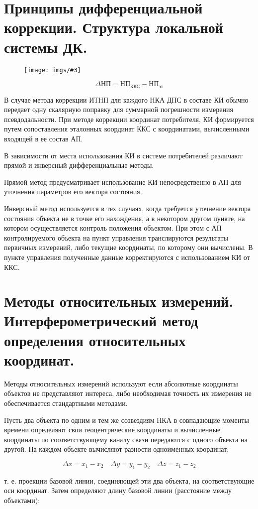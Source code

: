\documentclass[14pt,a4paper,oneside]{extarticle}
\newcommand{\pic}[3]{
	\begin{figure}[#1]
		\begin{center}
			\texttt{[image: imgs/\#3]}
		\end{center}
	\end{figure}
}
\begin{document}
\section{Принципы дифференциальной коррекции. Структура локальной системы ДК.}

\pic{H}{\textwidth}{12}

\[\Delta \text{НП} = \text{НП}_\text{ККС} - \text{НП}_\text{эт} \]

В случае метода коррекции ИТНП для каждого НКА ДПС в составе КИ обычно передает одну скалярную поправку для суммарной погрешности измерения псевдодальности. При методе коррекции координат потребителя, КИ формируется путем сопоставления эталонных координат ККС с координатами, вычисленными входящей в ее состав АП.

В зависимости от места использования КИ в системе потребителей различают прямой и инверсный дифференциальные методы.

Прямой метод предусматривает использование КИ непосредственно в АП для уточнения параметров его вектора состояния.

Инверсный метод используется в тех случаях, когда требуется уточнение вектора состояния объекта не в точке его нахождения, а в некотором другом пункте, на котором осуществляется контроль положения объектом. При этом с АП контролируемого объекта на пункт управления транслируются результаты первичных измерений, либо текущие координаты, по которому они вычислены. В пункте управления полученные данные корректируются с использованием КИ от ККС.

\section{Методы относительных измерений. Интерферометрический метод определения относительных координат.}

Методы относительных измерений используют если абсолютные координаты объектов не представляют интереса, либо необходимая точность их измерения не обеспечивается стандартными методами.

Пусть два объекта по одним и тем же созвездиям НКА в совпадающие моменты времени определяют свои геоцентрические координаты и вычисленные координаты по соответствующему каналу связи передаются с одного объекта на другой. На каждом объекте вычисляют разности одноименных координат:

\[\Delta x=x_1-x_2\quad\Delta y=y_1-y_2\quad\Delta z=z_1-z_2\]

т. е. проекции базовой линии, соединяющей эти два объекта, на соответствующие оси координат. Затем определяют длину базовой линии (расстояние между объектами):
\end{document}

